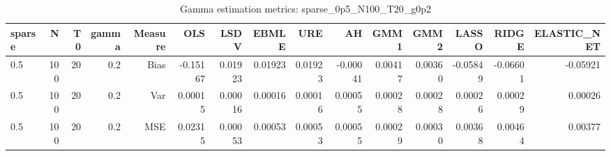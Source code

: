 \begin{table}[!htbp]\centering
\caption{Gamma estimation metrics: sparse_0p5_N100_T20_g0p2}
\label{tab:table1_sparse_0p5_N100_T20_g0p2}
\begin{tabular}{lrrrrrrrrrrrrrr}
\hline
sparse & N & T0 & gamma & Measure & OLS & LSDV & EBMLE & URE & AH & GMM1 & GMM2 & LASSO & RIDGE & ELASTIC_NET \\
\hline
0.5 & 100 & 20 & 0.2 & Bias & -0.15167 & 0.01923 & 0.01923 & 0.01923 & -0.00041 & 0.00417 & 0.00360 & -0.05849 & -0.06601 & -0.05921 \\
0.5 & 100 & 20 & 0.2 & Var & 0.00015 & 0.00016 & 0.00016 & 0.00016 & 0.00055 & 0.00028 & 0.00028 & 0.00026 & 0.00029 & 0.00026 \\
0.5 & 100 & 20 & 0.2 & MSE & 0.02315 & 0.00053 & 0.00053 & 0.00053 & 0.00055 & 0.00029 & 0.00030 & 0.00368 & 0.00464 & 0.00377 \\
\hline
\end{tabular}
\end{table}

